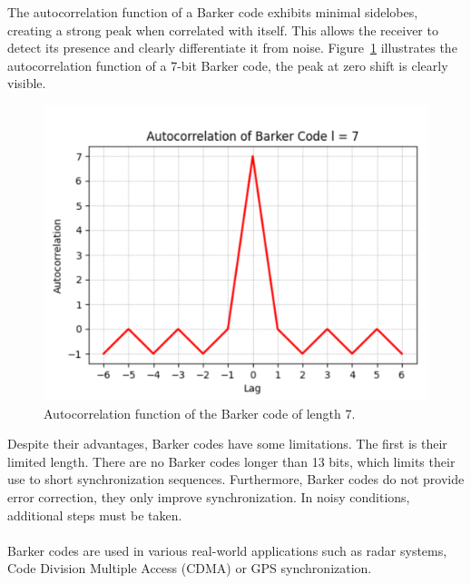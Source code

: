 The autocorrelation function of a Barker code exhibits minimal sidelobes, creating a strong peak when correlated with itself. This allows the receiver to detect its presence and clearly differentiate it from noise. Figure~\ref{fig:barker_code} illustrates the autocorrelation function of a 7-bit Barker code, the peak at zero shift is clearly visible.
\begin{figure}[h]
    \centering
    \includegraphics[scale=0.5]{images/ugly_barker_code.PNG}
    \caption{Autocorrelation function of the Barker code of length 7.}
    \label{fig:barker_code}
\end{figure}
Despite their advantages, Barker codes have some limitations. The first is their limited length. There are no Barker codes longer than 13 bits, which limits their use to short synchronization sequences. Furthermore, Barker codes do not provide error correction, they only improve synchronization. In noisy conditions, additional steps must be taken.
\\ \\
Barker codes are used in various real-world applications such as radar systems, Code Division Multiple Access (CDMA) or GPS synchronization.

